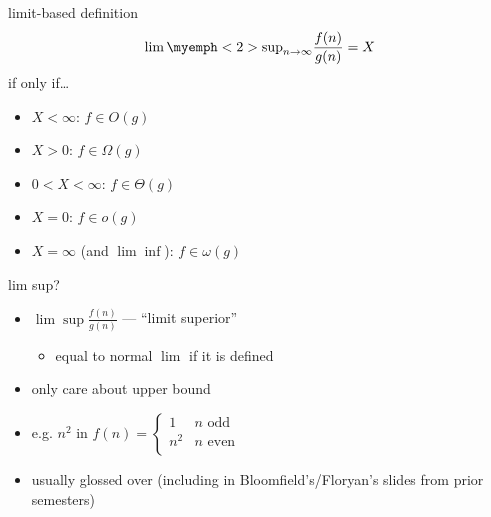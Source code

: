 \begin{frame}{limit-based definition}
\[\lim\myemph<2>{\sup}_{n\to\infty} \frac{f(n)}{g(n)} = X\]
if only if\ldots
\begin{itemize}
\item $X < \infty$: $f\in O(g)$
\item $X > 0$: $f \in \Omega(g)$
\item $0 < X < \infty$: $f \in \Theta(g)$
\item $X = 0$: $f \in o(g)$
\item $X = \infty$ (and $\lim\inf$): $f \in \omega(g)$
\end{itemize}
\end{frame}

\begin{frame}{lim sup?}
\begin{itemize}
\item $\lim\sup \frac{f(n)}{g(n)}$ --- ``limit superior''
    \begin{itemize}
        \item equal to normal $\lim$ if it is defined
    \end{itemize}
\item only care about upper bound
\item e.g. $n^2$ in  $f(n) = \begin{cases} 1 & n \text{ odd} \\n^2 & n \text{ even} \\ \end{cases}$
\vspace{.5cm}
\item usually glossed over (including in Bloomfield's/Floryan's slides from prior semesters)
\end{itemize}
\end{frame}
